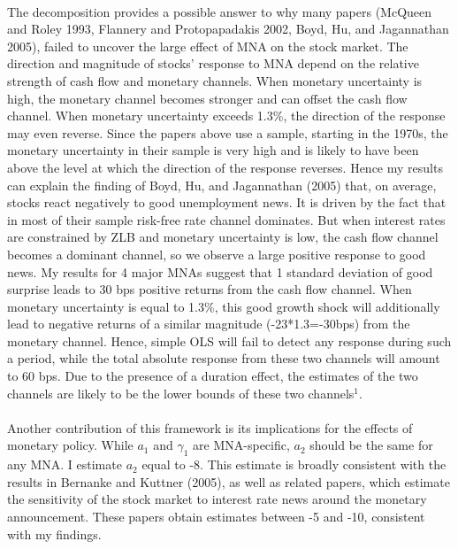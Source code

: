 \documentclass[12pt]{article}
\begin{document}
\paragraph{}
The decomposition provides a possible answer to why many papers (McQueen and Roley 1993, Flannery and Protopapadakis 2002, Boyd, Hu, and Jagannathan 2005), failed to uncover the large effect of MNA on the stock market. The direction and magnitude of stocks' response to MNA depend on the relative strength of cash flow and monetary channels. When monetary uncertainty is high, the monetary channel becomes stronger and can offset the cash flow channel. When monetary uncertainty exceeds 1.3\%, the direction of the response may even reverse. Since the papers above use a sample, starting in the 1970s, the monetary uncertainty in their sample is very high and is likely to have been above the level at which the direction of the response reverses. Hence my results can explain the finding of Boyd, Hu, and Jagannathan (2005) that, on average, stocks react negatively to good unemployment news. It is driven by the fact that in most of their sample risk-free rate channel dominates. But when interest rates are constrained by ZLB and monetary uncertainty is low, the cash flow channel becomes a dominant channel, so we observe a large positive response to good news. My results for 4 major MNAs suggest that 1 standard deviation of good surprise leads to 30 bps positive returns from the cash flow channel. When monetary uncertainty is equal to 1.3\%, this good growth shock will additionally lead to negative returns of a similar magnitude (-23*1.3=-30bps) from the monetary channel. Hence, simple OLS will fail to detect any response during such a period, while the total absolute response from these two channels will amount to 60 bps. Due to the presence of a duration effect, the estimates of the two channels are likely to be the lower bounds of these two channels$^1$. 
\paragraph{}
Another contribution of this framework is its implications for the effects of monetary policy. While ${a}_1$ and $\gamma_1$ are MNA-specific, $a_2$ should be the same for any MNA. I estimate ${a}_2$ equal to -8. This estimate is broadly consistent with the results in Bernanke and Kuttner (2005), as well as related papers, which estimate the sensitivity of the stock market to interest rate news around the monetary announcement. These papers obtain estimates between -5 and -10, consistent with my findings.
\end{document}
